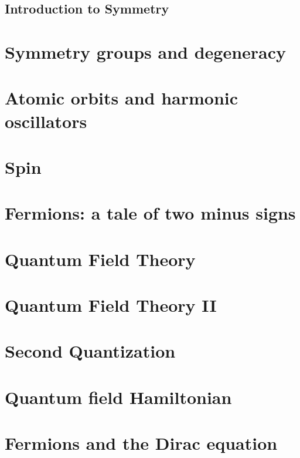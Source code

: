 \documentclass[]{article}
\begin{document}
\subsection{Introduction to Symmetry}

\section{Symmetry groups and degeneracy}

\section{Atomic orbits and harmonic oscillators}

\section{Spin}

\section{Fermions: a tale of two minus signs}



\section{Quantum Field Theory}

\section{Quantum Field Theory II}

\section {Second Quantization}

\section{Quantum field Hamiltonian}

\section{Fermions and the Dirac equation}
\end{document}
